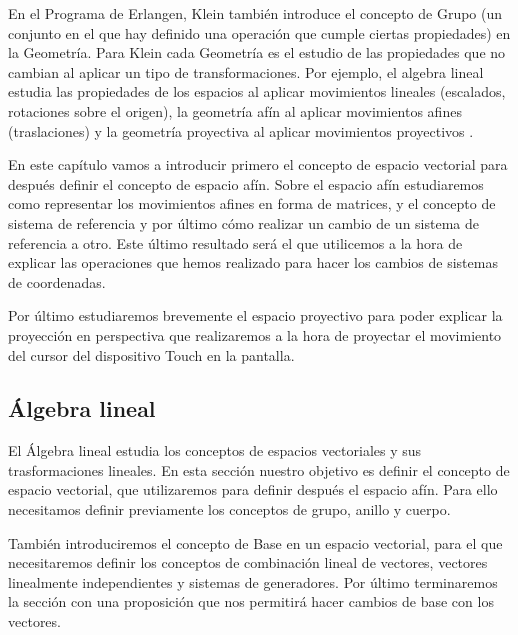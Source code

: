 \documentclass[a4paper,11pt, oneside]{book}
\begin{document}
En el Programa de Erlangen, Klein también introduce el concepto de Grupo (un conjunto en el que hay definido una operación que cumple ciertas propiedades) en la Geometría. Para Klein cada Geometría es el estudio de las propiedades que no cambian al aplicar un tipo de transformaciones. Por ejemplo, el algebra lineal estudia las propiedades de los espacios al aplicar movimientos lineales (escalados, rotaciones sobre el origen), la geometría afín al aplicar movimientos afines (traslaciones) y la geometría proyectiva al aplicar movimientos proyectivos \cite{bell}.

En este capítulo vamos a introducir primero el concepto de espacio vectorial para después definir el concepto de espacio afín. Sobre el espacio afín estudiaremos como representar los movimientos afines en forma de matrices, y el concepto de sistema de referencia y por último cómo realizar un cambio de un sistema de referencia a otro. Este último resultado será el que utilicemos a la hora de explicar las operaciones que hemos realizado para hacer los cambios de sistemas de coordenadas.

Por último estudiaremos brevemente el espacio proyectivo para poder explicar la proyección en perspectiva que realizaremos a la hora de proyectar el movimiento del cursor del dispositivo Touch en la pantalla.

 


\subsection{Álgebra lineal}

El Álgebra lineal estudia los conceptos de espacios vectoriales y sus trasformaciones lineales. En esta sección nuestro objetivo es definir el concepto de espacio vectorial, que utilizaremos para definir después el espacio afín. Para ello necesitamos definir previamente los conceptos de grupo, anillo y cuerpo. 

También introduciremos el concepto de Base en un espacio vectorial, para el que necesitaremos definir los conceptos de combinación lineal de vectores, vectores linealmente independientes y sistemas de generadores. Por último terminaremos la sección con una proposición que nos permitirá hacer cambios de base con los vectores.
\end{document}
